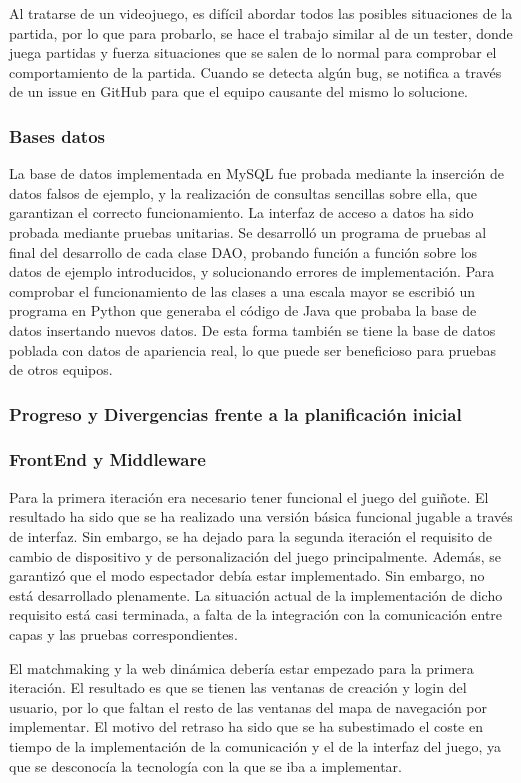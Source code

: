 Al tratarse de un videojuego, es difícil abordar todos las posibles situaciones de la partida, por lo que para probarlo, se hace el trabajo similar al de un tester, donde juega partidas y fuerza situaciones que se salen de lo normal para comprobar el comportamiento de la partida. Cuando se detecta algún bug, se notifica a través de un issue en GitHub para que el equipo causante del mismo lo solucione.

\subsubsection*{Bases datos}
La base de datos implementada en MySQL fue probada mediante la inserción de datos falsos de ejemplo, y la realización de consultas sencillas sobre ella, que garantizan el correcto funcionamiento. La interfaz de acceso a datos ha sido probada mediante pruebas unitarias. Se desarrolló un programa de pruebas al final del desarrollo de cada clase DAO, probando función a función sobre los datos de ejemplo introducidos, y solucionando errores de implementación. Para comprobar el funcionamiento de las clases a una escala mayor se escribió un programa en Python que generaba el código de Java que probaba la base de datos insertando nuevos datos. De esta forma también se tiene la base de datos poblada con datos de apariencia real, lo que puede ser beneficioso para pruebas de otros equipos.

\subsubsection*{Progreso y Divergencias frente a la planificación inicial}
\subsubsection*{FrontEnd y Middleware}
Para la primera iteración era necesario tener funcional el juego del guiñote. El resultado ha sido que se ha realizado una versión básica funcional jugable a través de interfaz. Sin embargo, se ha dejado para la segunda iteración el requisito de cambio de dispositivo y de personalización del juego principalmente. Además, se garantizó que el modo espectador debía estar implementado. Sin embargo, no está desarrollado plenamente. La situación actual de la implementación de dicho requisito está casi terminada, a falta de la integración con la comunicación entre capas y las pruebas correspondientes.

El matchmaking y la web dinámica debería estar empezado para la primera iteración. El resultado es que se tienen las ventanas de creación y login del usuario, por lo que faltan el resto de las ventanas del mapa de navegación por implementar. El motivo del retraso ha sido que se ha subestimado el coste en tiempo de la implementación de la comunicación y el de la interfaz del juego, ya que se desconocía la tecnología con la que se iba a implementar.

